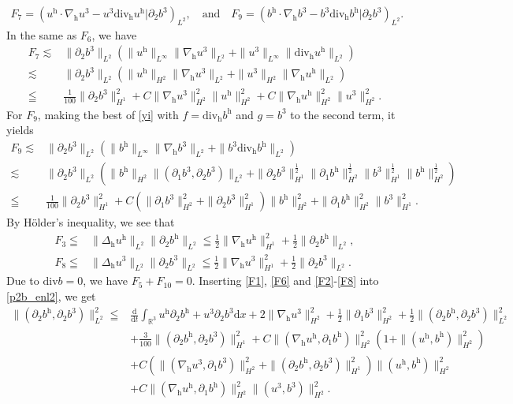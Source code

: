 \documentclass[11pt]{amsart}
\theoremstyle{definition}
\newcommand{\R}{\mathbb{R}}
\newcommand{\h}{\mathrm{h}}
\newcommand{\nablah}{\nabla_{\mathrm{h}}}
\numberwithin{equation}{section}
\begin{document}
\begin{align*}
	F_7=\left(u^\h\cdot \nablah u^3-u^3\mathrm{div_h} u^\h|\partial_2 b^3\right)_{L^2}, \quad\mathrm{and}\quad F_9=\left(b^\h\cdot \nablah b^3-b^3\mathrm{div_h} b^\h|\partial_2 b^3\right)_{L^2}.
\end{align*}
In the same as $F_6$, we have
\begin{align}\label{F7}
	F_7\lesssim&\|\partial_2 b^3\|_{L^2}\left( \|u^\h\|_{L^\infty}\| \nablah u^3\|_{L^2}+\|u^3\|_{L^\infty}\|\mathrm{div_h} u^\h\|_{L^2}\right)\nonumber\\
	\lesssim&\|\partial_2 b^3\|_{L^2}\left( \|u^\h\|_{H^2}\| \nablah u^3\|_{L^2}+\|u^3\|_{H^2}\|\nablah u^\h\|_{L^2}\right)\nonumber\\
	\leqq &\frac{1}{100} \|\partial_2 b^3\|_{H^1}^2+C\| \nablah u^3\|_{H^2}^2\|u^\h\|_{H^2}^2+C\|\nablah u^\h\|_{H^2}^2\|u^3\|_{H^2}^2.
\end{align}
For $F_9$, making the best of \eqref{yi} with $f=\mathrm{div_h} b^\h$ and $g=b^3$ to the second term, it yields
\begin{align}\label{F9}
	F_9\lesssim&\|\partial_2 b^3\|_{L^2}\left( \|b^\h\|_{L^\infty}\| \nablah b^3\|_{L^2}+\|b^3\mathrm{div_h} b^\h\|_{L^2}\right)\nonumber\\
	\lesssim&\|\partial_2 b^3\|_{L^2}\left( \|b^\h\|_{H^2}\|( \partial_1b^3,\partial_2b^3)\|_{L^2}+\|\partial_2b^3\|_{H^1}^\frac12\| \partial_1b^\h\|_{H^2}^\frac12\|b^3\|_{H^1}^\frac12\| b^\h\|_{H^2}^\frac12\right)\nonumber\\
	\leqq &\frac{1}{100} \|\partial_2 b^3\|_{H^1}^2+C\left(\|\partial_1b^3\|_{H^2}^2+\|\partial_2b^3\|_{H^1}^2\right)\|b^\h\|_{H^2}^2+\| \partial_1b^\h\|_{H^2}^2\|b^3\|_{H^1}^2.
\end{align}
By  H\"older's inequality, we see that
\begin{align}\label{F3}
	F_3\leqq& \|\Delta_\h u^\h\|_{L^2}\|\partial_2 b^\h\|_{L^2}\leqq \frac12\|\nabla_\h u^\h\|_{H^1}^2+\frac12\|\partial_2 b^\h\|_{L^2},\\\label{F8}
	F_8\leqq &\|\Delta_\h u^3\|_{L^2}\|\partial_2 b^3\|_{L^2}\leqq \frac12\|\nabla_\h u^3\|_{H^1}^2+\frac12\|\partial_2 b^3\|_{L^2}.
\end{align}
Due to $\mathrm{div} b=0$, we have $F_5+F_{10}=0$. Inserting \eqref{F1}, \eqref{F6} and \eqref{F2}-\eqref{F8} into \eqref{p2b_enl2}, we get
\begin{align}\label{Esti.p2bL2}
	\|(\partial_2b^\h,\partial_2 b^3)\|_{L^2}^2\leqq& \frac{\mathrm{d}}{\mathrm{d} t}\int_{\R^3} u^\h\partial_2 b^\h+u^3\partial_2 b^3\mathrm{d} x+2\|\nablah u^3\|_{H^2}^2+\frac12\|\partial_1 b^3\|_{H^2}^2+\frac12\|(\partial_2 b^\h,\partial_2b^3)\|_{L^2}^2\nonumber\\
	&+\frac{3}{100}\|(\partial_2 b^\h,\partial_2b^3)\|_{H^1}^2+C\|(\nablah u^\h,\partial_1 b^\h)\|_{H^2}^2\left(1+\|(u^\h,b^\h)\|_{H^2}^2\right)\nonumber\\
	&+C\left(\|(\nablah u^3,\partial_1b^3)\|_{H^2}^2+\|(\partial_2 b^\h,\partial_2 b^3)\|_{H^1}^2\right)\|(u^\h,b^\h)\|_{H^2}^2\nonumber\\
	&+C\|(\nablah u^\h,\partial_1 b^\h)\|_{H^2}^2\|(u^3,b^3)\|_{H^2}^2.
\end{align}
\end{document}
